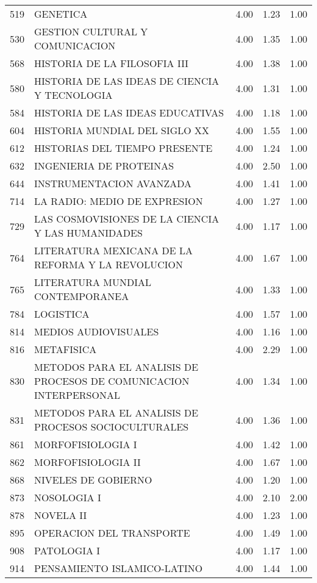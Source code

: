 \documentclass[12pt]{article}
\begin{document}
\begin{table}[ht]
\begin{tabular}{rlrrr}
  519 & GENETICA & 4.00 & 1.23 & 1.00 \\ 
  530 & GESTION CULTURAL Y COMUNICACION & 4.00 & 1.35 & 1.00 \\ 
  568 & HISTORIA DE LA FILOSOFIA III & 4.00 & 1.38 & 1.00 \\ 
  580 & HISTORIA DE LAS IDEAS DE CIENCIA Y TECNOLOGIA & 4.00 & 1.31 & 1.00 \\ 
  584 & HISTORIA DE LAS IDEAS EDUCATIVAS & 4.00 & 1.18 & 1.00 \\ 
  604 & HISTORIA MUNDIAL DEL SIGLO XX & 4.00 & 1.55 & 1.00 \\ 
  612 & HISTORIAS DEL TIEMPO PRESENTE & 4.00 & 1.24 & 1.00 \\ 
  632 & INGENIERIA DE PROTEINAS & 4.00 & 2.50 & 1.00 \\ 
  644 & INSTRUMENTACION AVANZADA & 4.00 & 1.41 & 1.00 \\ 
  714 & LA RADIO: MEDIO DE EXPRESION & 4.00 & 1.27 & 1.00 \\ 
  729 & LAS COSMOVISIONES DE LA CIENCIA Y LAS HUMANIDADES & 4.00 & 1.17 & 1.00 \\ 
  764 & LITERATURA MEXICANA DE LA REFORMA Y LA REVOLUCION & 4.00 & 1.67 & 1.00 \\ 
  765 & LITERATURA MUNDIAL CONTEMPORANEA & 4.00 & 1.33 & 1.00 \\ 
  784 & LOGISTICA & 4.00 & 1.57 & 1.00 \\ 
  814 & MEDIOS AUDIOVISUALES & 4.00 & 1.16 & 1.00 \\ 
  816 & METAFISICA & 4.00 & 2.29 & 1.00 \\ 
  830 & METODOS PARA EL ANALISIS DE PROCESOS DE COMUNICACION INTERPERSONAL & 4.00 & 1.34 & 1.00 \\ 
  831 & METODOS PARA EL ANALISIS DE PROCESOS SOCIOCULTURALES & 4.00 & 1.36 & 1.00 \\ 
  861 & MORFOFISIOLOGIA I & 4.00 & 1.42 & 1.00 \\ 
  862 & MORFOFISIOLOGIA II & 4.00 & 1.67 & 1.00 \\ 
  868 & NIVELES DE GOBIERNO & 4.00 & 1.20 & 1.00 \\ 
  873 & NOSOLOGIA I & 4.00 & 2.10 & 2.00 \\ 
  878 & NOVELA II & 4.00 & 1.23 & 1.00 \\ 
  895 & OPERACION DEL TRANSPORTE & 4.00 & 1.49 & 1.00 \\ 
  908 & PATOLOGIA I & 4.00 & 1.17 & 1.00 \\ 
  914 & PENSAMIENTO ISLAMICO-LATINO & 4.00 & 1.44 & 1.00 \\ 

\end{tabular}
\end{table}
\end{document}
